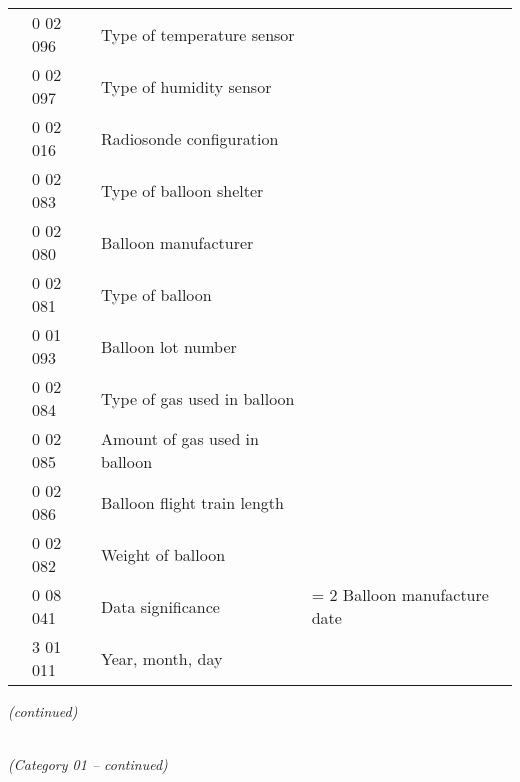 \begin{longtable}[]{@{}llll@{}}
& 0 02 096 & Type of temperature sensor &\tabularnewline
& 0 02 097 & Type of humidity sensor &\tabularnewline
& 0 02 016 & Radiosonde configuration &\tabularnewline
& 0 02 083 & Type of balloon shelter &\tabularnewline
& 0 02 080 & Balloon manufacturer &\tabularnewline
& 0 02 081 & Type of balloon &\tabularnewline
& 0 01 093 & Balloon lot number &\tabularnewline
& 0 02 084 & Type of gas used in balloon &\tabularnewline
& 0 02 085 & Amount of gas used in balloon &\tabularnewline
& 0 02 086 & Balloon flight train length &\tabularnewline
& 0 02 082 & Weight of balloon &\tabularnewline
& 0 08 041 & Data significance & = 2 Balloon manufacture date\tabularnewline
& 3 01 011 & Year, month, day &\tabularnewline
\bottomrule
\end{longtable}

\emph{(continued)}

\emph{\\
(Category 01 -- continued)}

